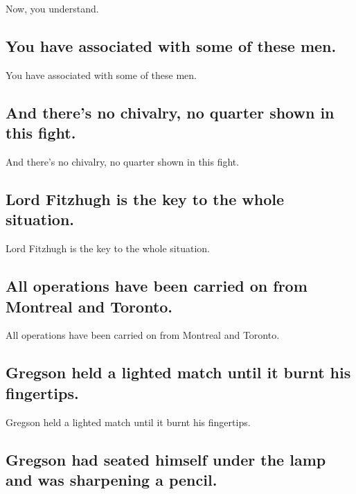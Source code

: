 \documentclass[]{article}
\begin{document}
Now, you understand.

\hypertarget{you-have-associated-with-some-of-these-men.}{%
\subsection{You have associated with some of these
men.}\label{you-have-associated-with-some-of-these-men.}}

You have associated with some of these men.

\hypertarget{and-theres-no-chivalry-no-quarter-shown-in-this-fight.}{%
\subsection{And there's no chivalry, no quarter shown in this
fight.}\label{and-theres-no-chivalry-no-quarter-shown-in-this-fight.}}

And there's no chivalry, no quarter shown in this fight.

\hypertarget{lord-fitzhugh-is-the-key-to-the-whole-situation.}{%
\subsection{Lord Fitzhugh is the key to the whole
situation.}\label{lord-fitzhugh-is-the-key-to-the-whole-situation.}}

Lord Fitzhugh is the key to the whole situation.

\hypertarget{all-operations-have-been-carried-on-from-montreal-and-toronto.}{%
\subsection{All operations have been carried on from Montreal and
Toronto.}\label{all-operations-have-been-carried-on-from-montreal-and-toronto.}}

All operations have been carried on from Montreal and Toronto.

\hypertarget{gregson-held-a-lighted-match-until-it-burnt-his-fingertips.}{%
\subsection{Gregson held a lighted match until it burnt his
fingertips.}\label{gregson-held-a-lighted-match-until-it-burnt-his-fingertips.}}

Gregson held a lighted match until it burnt his fingertips.

\hypertarget{gregson-had-seated-himself-under-the-lamp-and-was-sharpening-a-pencil.}{%
\subsection{Gregson had seated himself under the lamp and was sharpening
a
pencil.}\label{gregson-had-seated-himself-under-the-lamp-and-was-sharpening-a-pencil.}}
\end{document}
